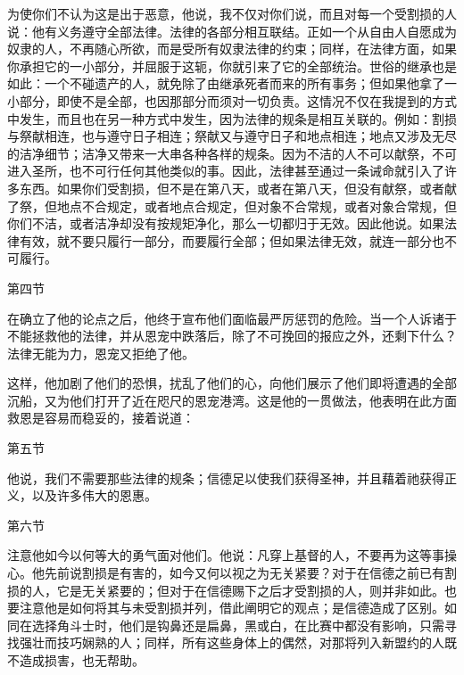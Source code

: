 为使你们不认为这是出于恶意，他说，我不仅对你们说，而且对每一个受割损的人说：他有义务遵守全部法律。法律的各部分相互联结。正如一个从自由人自愿成为奴隶的人，不再随心所欲，而是受所有奴隶法律的约束；同样，在法律方面，如果你承担它的一小部分，并屈服于这轭，你就引来了它的全部统治。世俗的继承也是如此：一个不碰遗产的人，就免除了由继承死者而来的所有事务；但如果他拿了一小部分，即使不是全部，也因那部分而须对一切负责。这情况不仅在我提到的方式中发生，而且也在另一种方式中发生，因为法律的规条是相互关联的。例如：割损与祭献相连，也与遵守日子相连；祭献又与遵守日子和地点相连；地点又涉及无尽的洁净细节；洁净又带来一大串各种各样的规条。因为不洁的人不可以献祭，不可进入圣所，也不可行任何其他类似的事。因此，法律甚至通过一条诫命就引入了许多东西。如果你们受割损，但不是在第八天，或者在第八天，但没有献祭，或者献了祭，但地点不合规定，或者地点合规定，但对象不合常规，或者对象合常规，但你们不洁，或者洁净却没有按规矩净化，那么一切都归于无效。因此他说。如果法律有效，就不要只履行一部分，而要履行全部；但如果法律无效，就连一部分也不可履行。\par

第四节  \par

在确立了他的论点之后，他终于宣布他们面临最严厉惩罚的危险。当一个人诉诸于不能拯救他的法律，并从恩宠中跌落后，除了不可挽回的报应之外，还剩下什么？法律无能为力，恩宠又拒绝了他。\par

这样，他加剧了他们的恐惧，扰乱了他们的心，向他们展示了他们即将遭遇的全部沉船，又为他们打开了近在咫尺的恩宠港湾。这是他的一贯做法，他表明在此方面救恩是容易而稳妥的，接着说道：\par

第五节  \par

他说，我们不需要那些法律的规条；信德足以使我们获得圣神，并且藉着祂获得正义，以及许多伟大的恩惠。\par

第六节  \par

注意他如今以何等大的勇气面对他们。他说：凡穿上基督的人，不要再为这等事操心。他先前说割损是有害的，如今又何以视之为无关紧要？对于在信德之前已有割损的人，它是无关紧要的；但对于在信德赐下之后才受割损的人，则并非如此。也要注意他是如何将其与未受割损并列，借此阐明它的观点；是信德造成了区别。如同在选择角斗士时，他们是钩鼻还是扁鼻，黑或白，在比赛中都没有影响，只需寻找强壮而技巧娴熟的人；同样，所有这些身体上的偶然，对那将列入新盟约的人既不造成损害，也无帮助。\par

